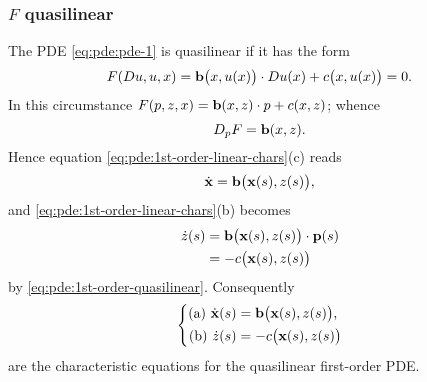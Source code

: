 \subsubsection[\(F\) quasilinear]{\(F\)  quasilinear}
The PDE \eqref{eq:pde:pde-1} is quasilinear if it has the form
\begin{equation}
  \label{eq:pde:1st-order-quasilinear}
  F(Du,u,x)=\mathbf{b}\bigl(x,u(x)\bigr)\cdot Du(x)+c\bigl(x,u(x)\bigr)=0.
\end{equation}
In this circumstance \(F(p,z,x)=\mathbf{b}(x,z)\cdot p+c(x,z)\); whence
\[
  D_pF=\mathbf{b}(x,z).
\]
Hence equation \eqref{eq:pde:1st-order-linear-chars}(c) reads
\[
  \dot{\mathbf{x}}=\mathbf{b}\bigl( \mathbf{x}(s),z(s) \bigr),
\]
and \eqref{eq:pde:1st-order-linear-chars}(b) becomes
\begin{align*}
  \dot z(s)&=\mathbf{b}\bigl(\mathbf{x}(s),z(s)\bigr)\cdot\mathbf{p}(s)\\
           &=-c\bigl(\mathbf{x}(s),z(s)\bigr)
\end{align*}
by \eqref{eq:pde:1st-order-quasilinear}. Consequently
\begin{equation}
  \label{eq:pde:1st-order-quasilinear-chars}
  \left\{
    \begin{aligned}
      \text{(a) } \dot{\mathbf{x}}(s)&=\mathbf{b}\bigl( \mathbf{x}(s),z(s) \bigr),\\
      \text{(b) } \dot z(s)&=-c\bigl( \mathbf{x}(s),z(s) \bigr)
    \end{aligned}
  \right.
\end{equation}
are the characteristic equations for the quasilinear first-order PDE.

